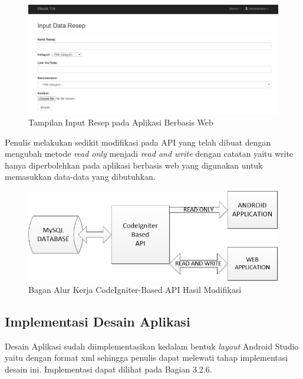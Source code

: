 		\begin{figure}[H]
			\centering
			\includegraphics[width=1\textwidth]{gambar/web-input-resep}
			\caption{Tampilan Input Resep pada Aplikasi Berbasis Web}
			\label{web-input-resep}
		\end{figure} 		
		Penulis melakukan sedikit modifikasi pada API yang telah dibuat dengan mengubah metode \textit{read only} menjadi \textit{read and write} dengan catatan yaitu write hanya diperbolehkan pada aplikasi berbasis web yang digunakan untuk memasukkan data-data yang dibutuhkan.  
		\begin{figure}[H]
			\centering
			\includegraphics[width=1\textwidth]{gambar/api/ci-api-web-chart}
			\caption{Bagan Alur Kerja CodeIgniter-Based API Hasil Modifikasi}
			\label{web-modification-resep}
		\end{figure} 	
	
	\subsection{Implementasi Desain Aplikasi}
		Desain Aplikasi sudah diimplementasikan kedalam bentuk \textit{layout} Android Studio yaitu dengan format xml sehingga penulis dapat melewati tahap implementasi desain ini. Implementasi dapat dilihat pada Bagian 3.2.6.
		
